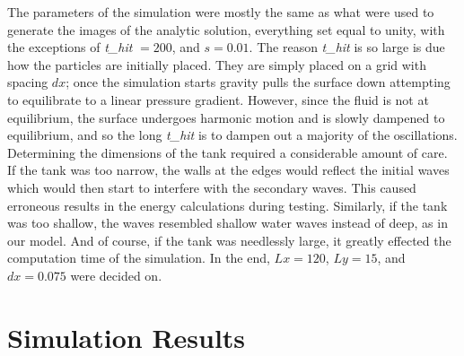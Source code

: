 \documentclass[12pt]{report}
\begin{document}
The parameters of the simulation were mostly the same as what were used to generate the images of the analytic solution, everything set equal to unity, with the exceptions of \emph{t\_hit} $= 200$, and $s=0.01$. The reason \emph{t\_hit} is so large is due how the particles are initially placed. They are simply placed on a grid with spacing $dx$; once the simulation starts gravity pulls the surface down attempting to equilibrate to a linear pressure gradient. However, since the fluid is not at equilibrium, the surface undergoes harmonic motion and is slowly dampened to equilibrium, and so the long \emph{t\_hit} is to dampen out a majority of the oscillations. \\

Determining the dimensions of the tank required a considerable amount of care. If the tank was too narrow, the walls at the edges would reflect the initial waves which would then start to interfere with the secondary waves. This caused erroneous results in the energy calculations during testing. Similarly, if the tank was too shallow, the waves resembled shallow water waves instead of deep, as in our model. And of course, if the tank was needlessly large, it greatly effected the computation time of the simulation. In the end, $Lx = 120$, $Ly = 15$, and $dx = 0.075$ were decided on.

\section{Simulation Results}
\end{document}
